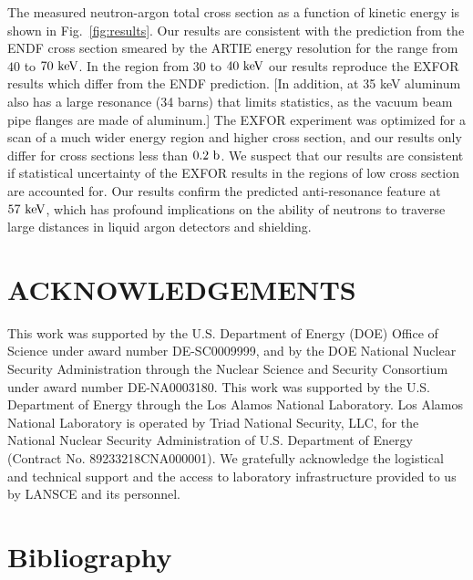 \documentclass[%
 reprint,
superscriptaddress,
 preprintnumbers,
 nofootinbib,
 nobibnotes,
 bibnotes,
 amsmath,amssymb,
 aps,
 prl, 
 floatfix,
]{revtex4-1}
\newcommand{\keV}{\mathrm{ke\kern -0.1em V}}
\begin{document}
The measured neutron-argon total cross section as a function of
kinetic energy is shown in Fig.~\ref{fig:results}.  Our results are
consistent with the prediction from the ENDF cross section smeared by
the ARTIE energy resolution for the range from $40$ to $70~\rm keV$.
In the region from $30$ to $40~\rm keV$ our results reproduce the
EXFOR results which differ from the ENDF prediction.
{\color{red} [In addition, at 35 keV aluminum also has a large
    resonance (34 barns) that limits statistics, as the vacuum beam
    pipe flanges are made of aluminum.]}
The EXFOR experiment was optimized for a scan of a
much wider energy region and higher cross section, and our results
only differ for cross sections less than $0.2~\rm b$.  We suspect that
our results are consistent if statistical uncertainty of the EXFOR
results in the regions of low cross section are accounted for.  Our
results confirm the predicted anti-resonance feature at $57~\keV$,
which has profound implications on the ability of neutrons to traverse
large distances in liquid argon detectors and shielding.


\section{\label{sec:acknowledgments}ACKNOWLEDGEMENTS}

This work was supported by the U.S. Department of Energy (DOE) Office
of Science under award number DE-SC0009999, and by the DOE National
Nuclear Security Administration through the Nuclear Science and
Security Consortium under award number DE-NA0003180. This work was
supported by the U.S. Department of Energy through the Los Alamos
National Laboratory. Los Alamos National Laboratory is operated by
Triad National Security, LLC, for the National Nuclear Security
Administration of U.S. Department of Energy (Contract
No. 89233218CNA000001).  We gratefully acknowledge the logistical and
technical support and the access to laboratory infrastructure provided
to us by LANSCE and its personnel.


\section{Bibliography}



\end{document}
